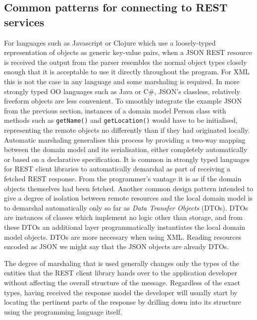 \documentclass[12pt, ]{article}
\begin{document}
\subsection{Common patterns for connecting to REST
services}\label{common-patterns-for-connecting-to-rest-services}

For languages such as Javascript or Clojure which use a loosely-typed
representation of objects as generic key-value pairs, when a JSON REST
resource is received the output from the parser resembles the normal
object types closely enough that it is acceptable to use it directly
throughout the program. For XML this is not the case in any language and
some marshaling is required. In more strongly typed OO languages such as
Java or C\#, JSON's classless, relatively freeform objects are less
convenient. To smoothly integrate the example JSON from the previous
section, instances of a domain model Person class with methods such as
\texttt{getName()} and \texttt{getLocation()} would have to be
initialised, representing the remote objects no differently than if they
had originated locally. Automatic marshaling generalises this process by
providing a two-way mapping between the domain model and its
serialisation, either completely automatically or based on a declarative
specification. It is common in strongly typed languages for REST client
libraries to automatically demarshal as part of receiving a fetched REST
response. From the programmer's vantage it is as if the domain objects
themselves had been fetched. Another common design pattern intended to
give a degree of isolation between remote resources and the local domain
model is to demarshal automatically only so far as \emph{Data Transfer
Objects} (DTOs). DTOs are instances of classes which implement no logic
other than storage, and from these DTOs an additional layer
programmatically instantiates the local domain model objects. DTOs are
more necessary when using XML. Reading resources encoded as JSON we
might say that the JSON objects are already DTOs.

The degree of marshaling that is used generally changes only the types
of the entities that the REST client library hands over to the
application developer without affecting the overall structure of the
message. Regardless of the exact types, having received the response
model the developer will usually start by locating the pertinent parts
of the response by drilling down into its structure using the
programming language itself.
\end{document}
